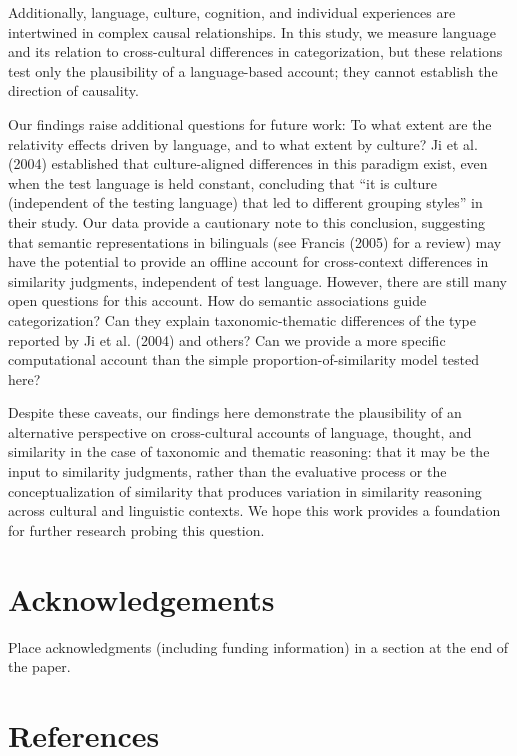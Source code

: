 \documentclass[10pt, letterpaper]{article}
\begin{document}
Additionally, language, culture, cognition, and individual experiences
are intertwined in complex causal relationships. In this study, we
measure language and its relation to cross-cultural differences in
categorization, but these relations test only the plausibility of a
language-based account; they cannot establish the direction of
causality.

Our findings raise additional questions for future work: To what extent
are the relativity effects driven by language, and to what extent by
culture? Ji et al. (2004) established that culture-aligned differences
in this paradigm exist, even when the test language is held constant,
concluding that ``it is culture (independent of the testing language)
that led to different grouping styles'' in their study. Our data provide
a cautionary note to this conclusion, suggesting that semantic
representations in bilinguals (see Francis (2005) for a review) may have
the potential to provide an offline account for cross-context
differences in similarity judgments, independent of test language.
However, there are still many open questions for this account. How do
semantic associations guide categorization? Can they explain
taxonomic-thematic differences of the type reported by Ji et al. (2004)
and others? Can we provide a more specific computational account than
the simple proportion-of-similarity model tested here?

Despite these caveats, our findings here demonstrate the plausibility of
an alternative perspective on cross-cultural accounts of language,
thought, and similarity in the case of taxonomic and thematic reasoning:
that it may be the input to similarity judgments, rather than the
evaluative process or the conceptualization of similarity that produces
variation in similarity reasoning across cultural and linguistic
contexts. We hope this work provides a foundation for further research
probing this question.

\hypertarget{acknowledgements}{%
\section{Acknowledgements}\label{acknowledgements}}

Place acknowledgments (including funding information) in a section at
the end of the paper.

\hypertarget{references}{%
\section{References}\label{references}}
\end{document}
